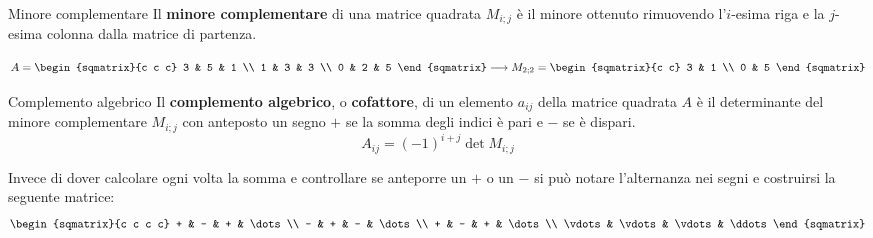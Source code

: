 \begin{newdef}{Minore complementare}
    Il \textbf{minore complementare} di una matrice quadrata $M_{i;j}$ è il minore ottenuto rimuovendo l'$i$-esima riga e la $j$-esima colonna dalla matrice di partenza.

    \[
        A = 
        \begin{sqmatrix}{c c c}
            3 & 5 & 1 \\
            1 & 3 & 3 \\
            0 & 2 & 5
        \end{sqmatrix}
        \longrightarrow
        M_{2;2} =
        \begin{sqmatrix}{c c}
            3 & 1 \\
            0 & 5
        \end{sqmatrix}
    \]
\end{newdef}
\begin{newdef}{Complemento algebrico}
    Il \textbf{complemento algebrico}, o \textbf{cofattore}, di un elemento $a_{ij}$ della matrice quadrata $A$ è il determinante del minore complementare $M_{i;j}$ con anteposto un segno $+$ se la somma degli indici è pari e $-$ se è dispari.
    \[
        A_{ij} = (-1)^{i + j}\det M_{i;j}
    \]
\end{newdef}
\begin{nb}
    Invece di dover calcolare ogni volta la somma e controllare se anteporre un $+$ o un $-$ si può notare l'alternanza nei segni e costruirsi la seguente matrice:
    \[
        \begin{sqmatrix}{c c c c}
            + & - & + & \dots \\
            - & + & - & \dots \\
            + & - & + & \dots \\
            \vdots & \vdots & \vdots & \ddots
        \end{sqmatrix}
    \]
\end{nb}

